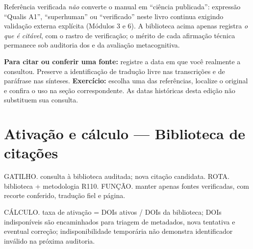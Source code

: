 \begin{aviso}
Referência verificada \emph{não} converte o manual em ``ciência publicada'':
expressão ``Qualis A1'', ``superhuman'' ou ``verificado'' neste livro continua
exigindo validação externa explícita (Módulos 3 e 6). A biblioteca acima apenas
registra \emph{o que é citável}, com o rastro de verificação; o mérito de cada
afirmação técnica permanece sob auditoria dos  e da avaliação
metacognitiva.
\end{aviso}

\begin{resultado}
\textbf{Para citar ou conferir uma fonte:} registre a data em que você
realmente a consultou. Preserve a identificação de tradução livre nas
transcrições e de paráfrase nas sínteses. \textbf{Exercício:} escolha uma das
\CoreReferenceCount{} referências, localize o original e confira o uso na seção
correspondente. As datas históricas desta edição não substituem sua consulta.
\end{resultado}



\section[Ativação e cálculo]{Ativação e cálculo — Biblioteca de citações}

\begin{processo}
GATILHO. consulta à biblioteca auditada; nova citação candidata.
ROTA. biblioteca  + metodologia R110.
FUNÇÃO. manter apenas fontes verificadas, com recorte conferido, tradução fiel e página.
\end{processo}

\begin{resultado}
CÁLCULO. taxa de ativação = DOIs ativos / DOIs da biblioteca; DOIs indisponíveis são encaminhados para triagem de metadados, nova tentativa e eventual correção; indisponibilidade temporária não demonstra identificador inválido na próxima auditoria.
\end{resultado}

